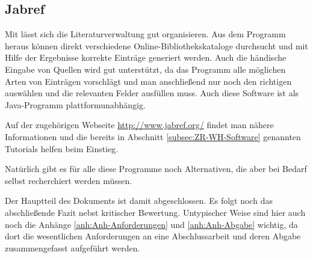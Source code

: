 \subsection{Jabref}
\label{subsec:jabref}
%
Mit  lässt sich die Literaturverwaltung gut organisieren. Aus dem Programm heraus können
direkt verschiedene Online-Bibliothekskataloge durchsucht und mit Hilfe der Ergebnisse korrekte Einträge
generiert werden. Auch die händische Eingabe von Quellen wird gut unterstützt, da das Programm alle möglichen
Arten von Einträgen vorschlägt und man anschließend nur noch den richtigen auswählen und die relevanten Felder
ausfüllen muss. Auch diese Software ist als Java-Programm plattformunabhängig.

Auf der zugehörigen Webseite \url{http://www.jabref.org/} findet man nähere Informationen und die bereits in
Abschnitt \vref{subsec:ZR-WH-Software} genannten Tutorials helfen beim Einstieg.

Natürlich gibt es für alle diese Programme noch Alternativen, die aber bei Bedarf selbst recherchiert werden
müssen.

Der Hauptteil des Dokuments ist damit abgeschlossen. Es folgt noch das abschließende Fazit nebst kritischer
Bewertung. Untypischer Weise sind hier auch noch die Anhänge \ref{anh:Anh-Anforderungen} und \ref{anh:Anh-Abgabe}
wichtig, da dort die wesentlichen Anforderungen an eine Abschlussarbeit und deren Abgabe zusammengefasst aufgeführt
werden.


